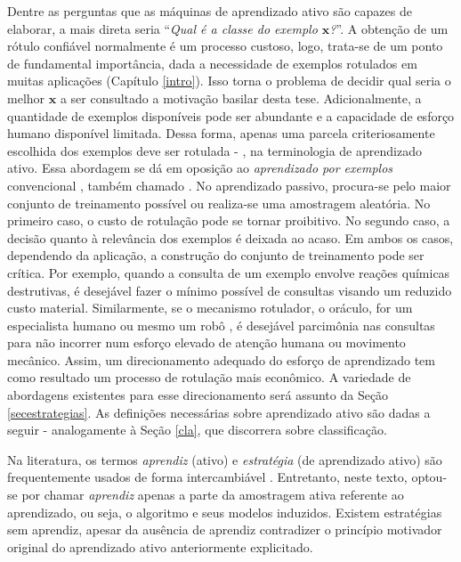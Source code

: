 Dentre as perguntas que as máquinas de aprendizado ativo são capazes de
elaborar, a mais direta seria ``\textit{Qual é a classe do exemplo $\bm{x}$?}''.
A obtenção de um rótulo confiável normalmente é um processo 
custoso, logo, trata-se de um ponto de fundamental importância, dada a necessidade de exemplos rotulados em muitas aplicações (Capítulo \ref{intro}).
Isso torna o problema de decidir qual seria o melhor $\bm{x}$ a ser consultado a motivação basilar desta tese.
Adicionalmente, a quantidade de exemplos disponíveis pode ser abundante e a capacidade de esforço humano disponível limitada.
Dessa forma, apenas uma parcela criteriosamente escolhida dos exemplos deve ser rotulada - , na terminologia de aprendizado ativo.
Essa abordagem se dá em oposição ao \textit{aprendizado por exemplos} convencional \cite{journals/cacm/Valiant84}, também chamado .
No aprendizado passivo, procura-se pelo maior conjunto de treinamento possível ou realiza-se uma amostragem aleatória.
No primeiro caso, o custo de rotulação pode se tornar proibitivo.
No segundo caso, a decisão quanto à relevância dos exemplos é deixada ao acaso.
Em ambos os casos, dependendo da aplicação, a construção do conjunto de treinamento pode ser crítica.
Por exemplo, quando a consulta de um exemplo envolve reações químicas
destrutivas, é desejável fazer o mínimo possível de consultas visando 
um reduzido custo material.
Similarmente, se o mecanismo rotulador, o oráculo, for um especialista humano ou mesmo um 
robô \cite{journals/etai/BryantMOKRK01}, é desejável parcimônia nas consultas para não incorrer num esforço elevado de atenção humana ou movimento mecânico.
Assim, um direcionamento adequado do esforço de aprendizado tem como
resultado um processo de rotulação mais econômico.
A variedade de abordagens existentes para esse direcionamento será assunto da Seção \ref{secestrategias}.
As definições necessárias sobre aprendizado ativo são dadas a seguir - analogamente à Seção \ref{cla}, que discorrera sobre classificação.

Na literatura, os termos \textit{aprendiz} (ativo) e \textit{estratégia} (de aprendizado ativo) são frequentemente usados de forma intercambiável \cite{journals/jcss/BalcanBL09}.
Entretanto, neste texto, optou-se por chamar \textit{aprendiz} apenas a parte da amostragem ativa referente ao aprendizado, ou seja, o algoritmo e seus modelos induzidos.
Existem estratégias sem aprendiz, apesar da ausência de aprendiz contradizer o princípio motivador original do aprendizado ativo anteriormente explicitado.

